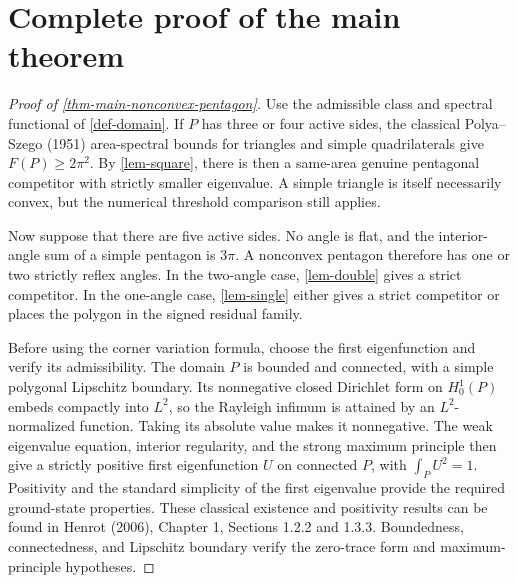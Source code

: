 \documentclass[11pt,a4paper]{article}
\theoremstyle{proofmanuscript}
\begin{document}
\section{Complete proof of the main theorem}

\begin{proof}[Proof of \ref{thm-main-nonconvex-pentagon}]

Use the admissible class and spectral functional of \ref{def-domain}. If \(P\) has three or four active sides, the classical Polya--Szego (1951) area-spectral bounds for triangles and simple quadrilaterals give \(F(P)\ge2\pi^2\). By \ref{lem-square}, there is then a same-area genuine pentagonal competitor with strictly smaller eigenvalue. A simple triangle is itself necessarily convex, but the numerical threshold comparison still applies.

Now suppose that there are five active sides. No angle is flat, and the interior-angle sum of a simple pentagon is \(3\pi\). A nonconvex pentagon therefore has one or two strictly reflex angles. In the two-angle case, \ref{lem-double} gives a strict competitor. In the one-angle case, \ref{lem-single} either gives a strict competitor or places the polygon in the signed residual family.

Before using the corner variation formula, choose the first eigenfunction and verify its admissibility. The domain \(P\) is bounded and connected, with a simple polygonal Lipschitz boundary. Its nonnegative closed Dirichlet form on \(H_0^1(P)\) embeds compactly into \(L^2\), so the Rayleigh infimum is attained by an \(L^2\)-normalized function. Taking its absolute value makes it nonnegative. The weak eigenvalue equation, interior regularity, and the strong maximum principle then give a strictly positive first eigenfunction \(U\) on connected \(P\), with \(\int_PU^2=1\). Positivity and the standard simplicity of the first eigenvalue provide the required ground-state properties. These classical existence and positivity results can be found in Henrot (2006), Chapter 1, Sections 1.2.2 and 1.3.3. Boundedness, connectedness, and Lipschitz boundary verify the zero-trace form and maximum-principle hypotheses.


\end{proof}
\end{document}
